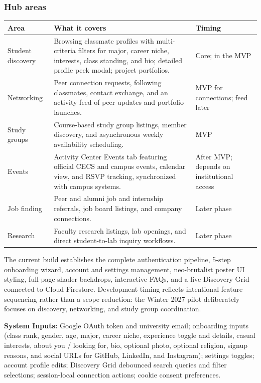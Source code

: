 \documentclass[11pt,letterpaper]{article}
\begin{document}
\subsubsection*{Hub areas}

\begin{table}[h!]
\centering
\small
\begin{tabularx}{\textwidth}{p{2.8cm} Y p{2.8cm}}
\toprule
\textbf{Area} & \textbf{What it covers} & \textbf{Timing} \\
\midrule
Student discovery & Browsing classmate profiles with multi-criteria filters for major, career niche, interests, class standing, and bio; detailed profile peek modal; project portfolios. & Core; in the MVP \\
Networking & Peer connection requests, following classmates, contact exchange, and an activity feed of peer updates and portfolio launches. & MVP for connections; feed later \\
Study groups & Course-based study group listings, member discovery, and asynchronous weekly availability scheduling. & MVP \\
Events & Activity Center Events tab featuring official CECS and campus events, calendar view, and RSVP tracking, synchronized with campus systems. & After MVP; depends on institutional access \\
Job finding & Peer and alumni job and internship referrals, job board listings, and company connections. & Later phase \\
Research & Faculty research listings, lab openings, and direct student-to-lab inquiry workflows. & Later phase \\
\bottomrule
\end{tabularx}
\end{table}

The current build establishes the complete authentication pipeline, 5-step onboarding wizard, account and settings management, neo-brutalist poster UI styling, full-page shader backdrops, interactive FAQs, and a live Discovery Grid connected to Cloud Firestore. Development timing reflects intentional feature sequencing rather than a scope reduction: the Winter 2027 pilot deliberately focuses on discovery, networking, and study group coordination.

\textbf{System Inputs:} Google OAuth token and university email; onboarding inputs (class rank, gender, age, major, career niche, experience toggle and details, casual interests, about you / looking for, bio, optional photo, optional religion, signup reasons, and social URLs for GitHub, LinkedIn, and Instagram); settings toggles; account profile edits; Discovery Grid debounced search queries and filter selections; session-local connection actions; cookie consent preferences.
\end{document}
